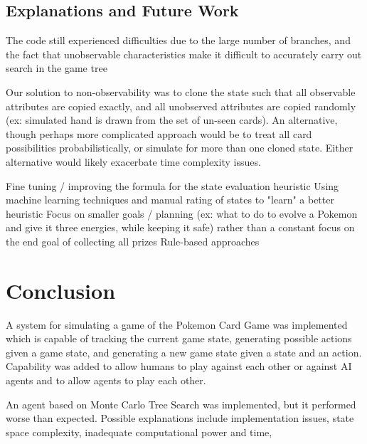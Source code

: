 \documentclass{article}
\begin{document}
\subsection{Explanations and Future Work} %
The code still experienced difficulties due to the large number of branches, and the fact that unobservable characteristics make it difficult to accurately carry out search in the game tree

Our solution to non-observability was to clone the state such that all observable attributes are copied exactly, and all unobserved attributes are copied randomly (ex: simulated hand is drawn from the set of un-seen cards). An alternative, though perhaps more complicated approach would be to treat all card possibilities probabilistically, or simulate for more than one cloned state.  Either alternative would likely exacerbate time complexity issues.

Fine tuning / improving the formula for the state evaluation heuristic 
Using machine learning techniques and manual rating of states to "learn" a better heuristic
Focus on smaller goals / planning (ex: what to do to evolve a Pokemon and give it three energies, while keeping it safe) rather than a constant focus on the end goal of collecting all prizes
Rule-based approaches

\section{Conclusion} %
A system for simulating a game of the Pokemon Card Game was implemented which is capable of tracking the current game state, generating possible actions given a game state, and generating a new game state given a state and an action. Capability was added to allow humans to play against each other or against AI agents and to allow agents to play each other. 

An agent based on Monte Carlo Tree Search was implemented, but it performed worse than expected. Possible explanations include implementation issues, state space complexity, inadequate computational power and time, 

\nocite{langley00}



\end{document}

